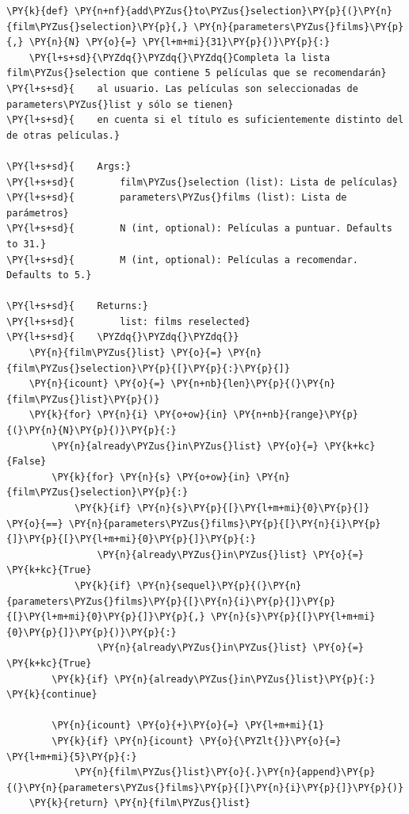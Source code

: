     \begin{tcolorbox}[breakable, size=fbox, boxrule=1pt, pad at break*=1mm,colback=cellbackground, colframe=cellborder]
\begin{Verbatim}[commandchars=\\\{\}]
\PY{k}{def} \PY{n+nf}{add\PYZus{}to\PYZus{}selection}\PY{p}{(}\PY{n}{film\PYZus{}selection}\PY{p}{,} \PY{n}{parameters\PYZus{}films}\PY{p}{,} \PY{n}{N} \PY{o}{=} \PY{l+m+mi}{31}\PY{p}{)}\PY{p}{:}
    \PY{l+s+sd}{\PYZdq{}\PYZdq{}\PYZdq{}Completa la lista film\PYZus{}selection que contiene 5 películas que se recomendarán}
\PY{l+s+sd}{    al usuario. Las películas son seleccionadas de parameters\PYZus{}list y sólo se tienen}
\PY{l+s+sd}{    en cuenta si el título es suficientemente distinto del de otras películas.}

\PY{l+s+sd}{    Args:}
\PY{l+s+sd}{        film\PYZus{}selection (list): Lista de películas}
\PY{l+s+sd}{        parameters\PYZus{}films (list): Lista de parámetros}
\PY{l+s+sd}{        N (int, optional): Películas a puntuar. Defaults to 31.}
\PY{l+s+sd}{        M (int, optional): Películas a recomendar. Defaults to 5.}

\PY{l+s+sd}{    Returns:}
\PY{l+s+sd}{        list: films reselected}
\PY{l+s+sd}{    \PYZdq{}\PYZdq{}\PYZdq{}}
    \PY{n}{film\PYZus{}list} \PY{o}{=} \PY{n}{film\PYZus{}selection}\PY{p}{[}\PY{p}{:}\PY{p}{]}
    \PY{n}{icount} \PY{o}{=} \PY{n+nb}{len}\PY{p}{(}\PY{n}{film\PYZus{}list}\PY{p}{)}    
    \PY{k}{for} \PY{n}{i} \PY{o+ow}{in} \PY{n+nb}{range}\PY{p}{(}\PY{n}{N}\PY{p}{)}\PY{p}{:}
        \PY{n}{already\PYZus{}in\PYZus{}list} \PY{o}{=} \PY{k+kc}{False}
        \PY{k}{for} \PY{n}{s} \PY{o+ow}{in} \PY{n}{film\PYZus{}selection}\PY{p}{:}
            \PY{k}{if} \PY{n}{s}\PY{p}{[}\PY{l+m+mi}{0}\PY{p}{]} \PY{o}{==} \PY{n}{parameters\PYZus{}films}\PY{p}{[}\PY{n}{i}\PY{p}{]}\PY{p}{[}\PY{l+m+mi}{0}\PY{p}{]}\PY{p}{:} 
                \PY{n}{already\PYZus{}in\PYZus{}list} \PY{o}{=} \PY{k+kc}{True}
            \PY{k}{if} \PY{n}{sequel}\PY{p}{(}\PY{n}{parameters\PYZus{}films}\PY{p}{[}\PY{n}{i}\PY{p}{]}\PY{p}{[}\PY{l+m+mi}{0}\PY{p}{]}\PY{p}{,} \PY{n}{s}\PY{p}{[}\PY{l+m+mi}{0}\PY{p}{]}\PY{p}{)}\PY{p}{:} 
                \PY{n}{already\PYZus{}in\PYZus{}list} \PY{o}{=} \PY{k+kc}{True}            
        \PY{k}{if} \PY{n}{already\PYZus{}in\PYZus{}list}\PY{p}{:} \PY{k}{continue}
            
        \PY{n}{icount} \PY{o}{+}\PY{o}{=} \PY{l+m+mi}{1}
        \PY{k}{if} \PY{n}{icount} \PY{o}{\PYZlt{}}\PY{o}{=} \PY{l+m+mi}{5}\PY{p}{:}
            \PY{n}{film\PYZus{}list}\PY{o}{.}\PY{n}{append}\PY{p}{(}\PY{n}{parameters\PYZus{}films}\PY{p}{[}\PY{n}{i}\PY{p}{]}\PY{p}{)}
    \PY{k}{return} \PY{n}{film\PYZus{}list}
\end{Verbatim}
\end{tcolorbox}

